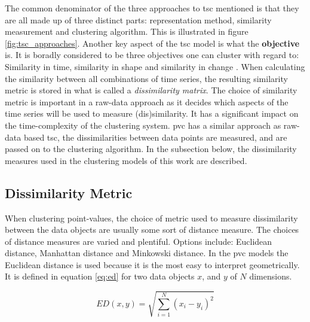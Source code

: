 The common denominator of the three approaches to \acrshort{tsc} mentioned is that they are all made up of three distinct parts: representation method, similarity measurement and clustering algorithm. This is illustrated in figure \ref{fig:tsc_approaches}. Another key aspect of the \acrshort{tsc} model is what the \textbf{objective} is. It is boradly considered to be three objectives one can cluster with regard to: Similarity in time, similarity in shape and similarity in change \cite{tsc_rev}. When calculating the similarity between all combinations of time series, the resulting similarity metric is stored in what is called a \textit{dissimilarity matrix}. The choice of similarity metric is important in a raw-data approach as it decides which aspects of the time series will be used to measure (dis)similarity. It has a significant impact on the time-complexity of the clustering system. \acrshort{pvc} has a similar approach as raw-data based \acrshort{tsc}, the dissimilarities between data points are measured, and are passed on to the clustering algorithm. In the subsection below, the dissimilarity measures used in the clustering models of this work are described.

\subsection{Dissimilarity Metric} \label{sec:theory_diss}
When clustering point-values, the choice of metric used to measure dissimilarity between the data objects are usually some sort of distance measure. The choices of distance measures are varied and plentiful. Options include: Euclidean distance, Manhattan distance and Minkowski distance. In the \acrshort{pvc} models the Euclidean distance is used because it is the most easy to interpret geometrically. It is defined in equation \eqref{eq:ed} for two data objects $x$, and $y$ of $N$ dimensions.

\begin{equation}
    ED(x,y) = \sqrt{\sum_{i = 1}^N (x_i - y_i)^2}
    \label{eq:ed}
\end{equation}

